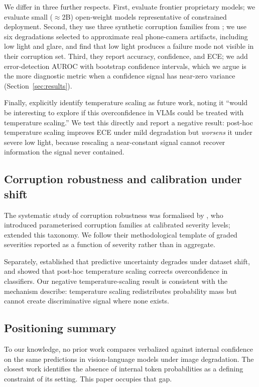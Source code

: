 \documentclass[11pt]{article}
\begin{document}
We differ in three further respects. First, \citet{borszukovszki2025} evaluate
frontier proprietary models; we evaluate small ($\approx$2B) open-weight models
representative of constrained deployment. Second, they use three synthetic
corruption families from \citet{michaelis2019}; we use six degradations selected
to approximate real phone-camera artifacts, including low light and glare, and
find that low light produces a failure mode not visible in their corruption set.
Third, they report accuracy, confidence, and ECE; we add error-detection AUROC
with bootstrap confidence intervals, which we argue is the more diagnostic
metric when a confidence signal has near-zero variance
(Section~\ref{sec:results}).

Finally, \citet{borszukovszki2025} explicitly identify temperature scaling as
future work, noting it ``would be interesting to explore if this overconfidence
in VLMs could be treated with temperature scaling.'' We test this directly and
report a negative result: post-hoc temperature scaling improves ECE under mild
degradation but \emph{worsens} it under severe low light, because rescaling a
near-constant signal cannot recover information the signal never contained.

\subsection{Corruption robustness and calibration under shift}

The systematic study of corruption robustness was formalised by
\citet{hendrycks2019}, who introduced parameterised corruption families at
calibrated severity levels; \citet{michaelis2019} extended this taxonomy. We
follow their methodological template of graded severities reported as a function
of severity rather than in aggregate.

Separately, \citet{ovadia2019} established that predictive uncertainty degrades
under dataset shift, and \citet{guo2017} showed that post-hoc temperature scaling
corrects overconfidence in classifiers. Our negative temperature-scaling result
is consistent with the mechanism \citet{guo2017} describe: temperature scaling
redistributes probability mass but cannot create discriminative signal where
none exists.

\subsection{Positioning summary}

To our knowledge, no prior work compares verbalized against internal confidence
on the same predictions in vision-language models under image degradation. The
closest work \citep{borszukovszki2025} identifies the absence of internal token
probabilities as a defining constraint of its setting. This paper occupies that
gap.
\end{document}
